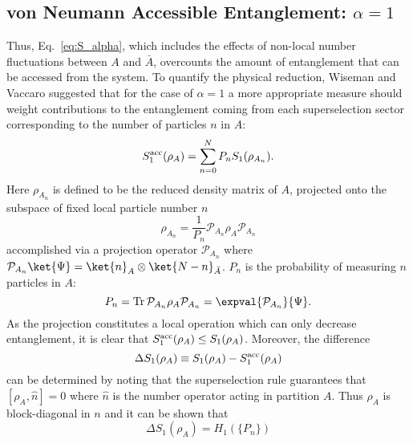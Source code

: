 \subsection{von Neumann Accessible Entanglement: $\alpha = 1$}

Thus, Eq.~\eqref{eq:S_alpha}, which includes the effects of non-local number fluctuations between $A$ and $\bar{A}$, overcounts the amount of entanglement that can be accessed from the system.  To quantify the physical reduction, Wiseman and Vaccaro \cite{Wiseman:2003jx} suggested that for the case of $\alpha = 1$ a more appropriate measure should weight contributions to the entanglement coming from each superselection sector corresponding to the number of particles $n$ in $A$:
%
\begin{equation}
    S_1^{\rm{acc}}(\rho_A)=\sum_{n=0}^{N} P_n S_1(\rho_{A_n})
\label{eq:S1acc}.
\end{equation}
%
Here $\rho_{A_{n}}$ is defined to be the reduced density matrix of $A$, projected onto the subspace of fixed local particle number $n$ 
%
\begin{equation}
    \rho_{A_n} = \frac{1}{P_n}{\mathcal{P}}_{A_n} \rho_{A} {\mathcal{P}}_{A_n}
\label{eq:rhoAn}
\end{equation}
%
accomplished via a projection operator ${\mathcal{P}}_{A_n}$ where
${\mathcal{P}}_{A_n} \ket{\Psi} = \ket{n}_A\otimes\ket{N-n}_{\bar{A}}$.  
$P_n$ is the probability of measuring $n$ particles in $A$:
%
\begin{equation}
    P_n = \mathrm{Tr}\, {\mathcal{P}}_{A_n} \rho_A{\mathcal{P}}_{A_n}
    = \expval{{\mathcal{P}}_{A_n}}{\Psi}.
    \label{eq:Pn}
\end{equation}
%
As the projection constitutes a local operation which can only decrease
entanglement,  it is clear that $S_1^{\rm acc}(\rho_A) \le S_1(\rho_A)$. 
Moreover, the difference 
%
\begin{equation}
    \Delta S_1 (\rho_A) \equiv S_1(\rho_A) - S_1^{\rm acc}(\rho_A)
    \label{eq:DeltaS1}
\end{equation}
%
can be determined  by noting that the superselection rule guarantees that $[\rho_A,\hat{n}]=0$ where $\hat{n}$ is the number operator acting in partition $A$. Thus $\rho_A$ is block-diagonal in $n$ and it can be shown \cite{Klich:2008se} that 
%
\begin{equation}
    \Delta S_1 (\rho_A) =  H_1(\{P_n\})
\label{eq:DS1H1}
\end{equation}
